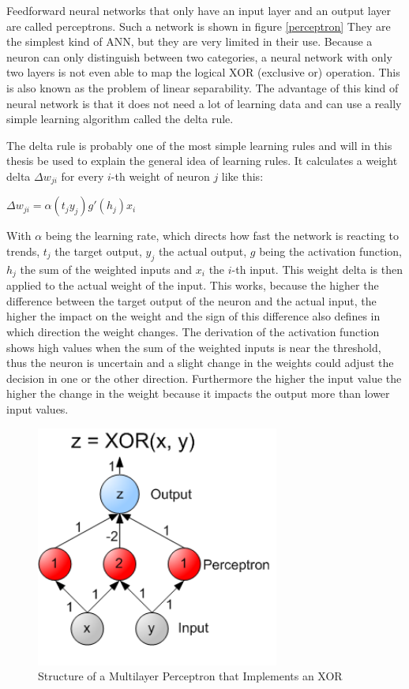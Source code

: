 Feedforward neural networks that only have an input layer and an output layer are called perceptrons. Such a network is shown in figure \ref{perceptron} They are the simplest kind of ANN, but they are very limited in their use. Because a neuron can only distinguish between two categories, a neural network with only two layers is not even able to map the logical XOR (exclusive or) operation. \cite{Minsky1988} This is also known as the problem of linear separability. The advantage of this kind of neural network is that it does not need a lot of learning data and can use a really simple learning algorithm called the delta rule.

The delta rule is probably one of the most simple learning rules and will in this thesis be used to explain the general idea of learning rules. It calculates a weight delta $\Delta w_{ji}$ for every $i$-th weight of neuron $j$ like this:

\begin{center}
	$\Delta w_{ji} = \alpha (t_j  y_j)g'(h_j)x_i$
\end{center}


With $\alpha$ being the learning rate, which directs how fast the network is reacting to trends, $t_j$ the target output, $y_j$ the actual output, $g$ being the activation function, $h_j$ the sum of the weighted inputs and $x_i$ the $i$-th input. This weight delta is then applied to the actual weight of the input. This works, because the higher the difference between the target output of the neuron and the actual input, the higher the impact on the weight and the sign of this difference also defines in which direction the weight changes. The derivation of the activation function shows high values when the sum of the weighted inputs is near the threshold, thus the neuron is uncertain and a slight change in the weights could adjust the decision in one or the other direction. Furthermore the higher the input value the higher the change in the weight because it impacts the output more than lower input values. \cite{deltaRule}

\begin{figure}[ht]
	\centering
  \includegraphics[width=8cm]{figures/multilayer_XOR}
	\caption[Structure of a Multilayer Perceptron that Implements an XOR]{Structure of a Multilayer Perceptron that Implements an XOR \protect\footnotemark}
	\label{multilayer_XOR}
\end{figure}

